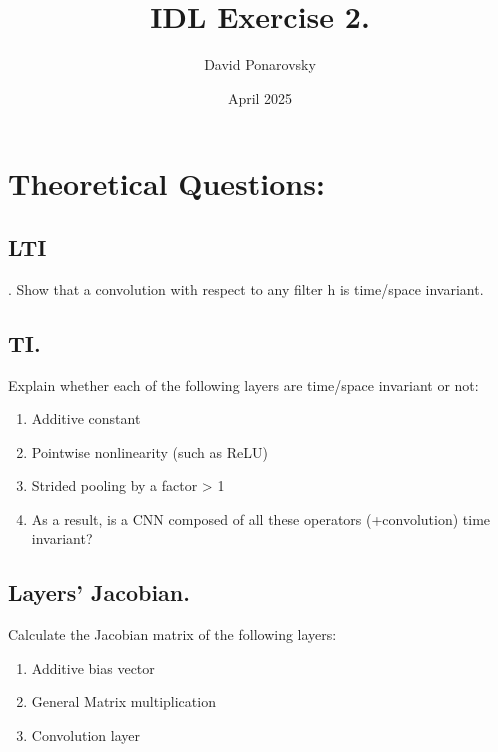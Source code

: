 \documentclass{article}
\title{IDL Exercise 2.}
\author{David Ponarovsky}
\date{April 2025}
\begin{document}
\maketitle

\section{Theoretical Questions:}

\subsection{LTI}. Show that a convolution with respect to any filter h is time/space invariant.

\subsection{TI.} Explain whether each of the following layers are time/space invariant or not:
\begin{enumerate}
  \item Additive constant
  \item Pointwise nonlinearity (such as ReLU)
  \item Strided pooling by a factor > 1
  \item As a result, is a CNN composed of all these operators (+convolution) time invariant?
\end{enumerate}

\subsection{Layers’ Jacobian.} Calculate the Jacobian matrix of the following layers:
\begin{enumerate}
  \item Additive bias vector
  \item General Matrix multiplication
  \item Convolution layer
\end{enumerate}
\end{document}
